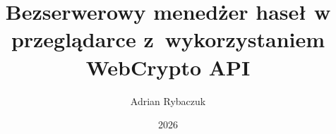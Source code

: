 \documentclass[thesis=inz,faculty=ee]{thesis}
\title{Bezserwerowy menedżer haseł w przeglądarce z~wykorzystaniem WebCrypto API}
\author{Adrian Rybaczuk}
\date{2026}
\begin{document}
    \frontpages

    

    \bibliografia

    \acronymslist
    \listoffigures
    \listoftables
    \easyappendices
\end{document}
